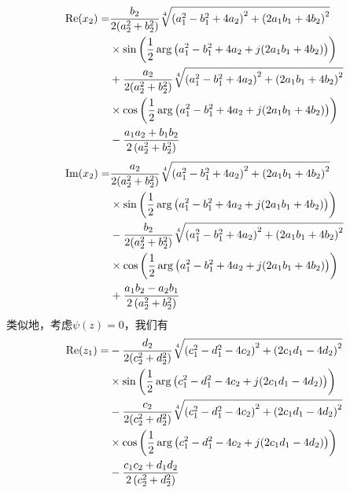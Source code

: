\begin{align}
{\mathop{\rm Re}\nolimits} ({x_2}) =&   \frac{{{b_2}}}{{2(a_2^2 + b_2^2)}}\sqrt[4]{{{{\left( {a_1^2 - b_1^2 + 4{a_2}} \right)}^2} + {{\left( {2{a_1}{b_1} + 4{b_2}} \right)}^2}}} \notag \\
& \times \sin \left( {\frac{1}{2}\arg \left( {a_1^2 - b_1^2 + 4{a_2} + j(2{a_1}{b_1} + 4{b_2})} \right)} \right) \notag \\
& + \frac{{{a_2}}}{{2(a_2^2 + b_2^2)}}\sqrt[4]{{{{\left( {a_1^2 - b_1^2 + 4{a_2}} \right)}^2} + {{\left( {2{a_1}{b_1} + 4{b_2}} \right)}^2}}} \notag \\
& \times \cos \left( {\frac{1}{2}\arg \left( {a_1^2 - b_1^2 + 4{a_2} + j(2{a_1}{b_1} + 4{b_2})} \right)} \right) \notag \\
& - \frac{{{a_1}{a_2} + {b_1}{b_2}}}{{2\left( {a_2^2 + b_2^2} \right)}}\label{eq:e5}
\end{align}
\begin{align}
{\mathop{\rm Im}\nolimits} ({x_2}) =&   \frac{{{a_2}}}{{2(a_2^2 + b_2^2)}}\sqrt[4]{{{{\left( {a_1^2 - b_1^2 + 4{a_2}} \right)}^2} + {{\left( {2{a_1}{b_1} + 4{b_2}} \right)}^2}}} \notag \\
& \times \sin \left( {\frac{1}{2}\arg \left( {a_1^2 - b_1^2 + 4{a_2} + j(2{a_1}{b_1} + 4{b_2})} \right)} \right) \notag \\
& - \frac{{{b_2}}}{{2(a_2^2 + b_2^2)}}\sqrt[4]{{{{\left( {a_1^2 - b_1^2 + 4{a_2}} \right)}^2} + {{\left( {2{a_1}{b_1} + 4{b_2}} \right)}^2}}} \notag \\
& \times \cos \left( {\frac{1}{2}\arg \left( {a_1^2 - b_1^2 + 4{a_2} + j(2{a_1}{b_1} + 4{b_2})} \right)} \right) \notag \\
& + \frac{{{a_1}{b_2} - {a_2}{b_1}}}{{2\left( {a_2^2 + b_2^2} \right)}}\label{eq:e6}
\end{align}
类似地，考虑$\psi (z)=0$，我们有
\begin{align}
{\mathop{\rm Re}\nolimits} ({z_1}) =&  - \frac{{{d_2}}}{{2(c_2^2 + d_2^2)}}\sqrt[4]{{{{\left( {c_1^2 - d_1^2 - 4{c_2}} \right)}^2} + {{\left( {2{c_1}{d_1} - 4{d_2}} \right)}^2}}} \notag \\
& \times \sin \left( {\frac{1}{2}\arg \left( {c_1^2 - d_1^2 - 4{c_2} + j(2{c_1}{d_1} - 4{d_2})} \right)} \right) \notag \\
& - \frac{{{c_2}}}{{2(c_2^2 + d_2^2)}}\sqrt[4]{{{{\left( {c_1^2 - d_1^2 - 4{c_2}} \right)}^2} + {{\left( {2{c_1}{d_1} - 4{d_2}} \right)}^2}}} \notag \\
& \times \cos \left( {\frac{1}{2}\arg \left( {c_1^2 - d_1^2 - 4{c_2} + j(2{c_1}{d_1} - 4{d_2})} \right)} \right) \notag \\
& - \frac{{{c_1}{c_2} + {d_1}{d_2}}}{{2\left( {c_2^2 + d_2^2} \right)}}  \label{eq:e7}
\end{align}
